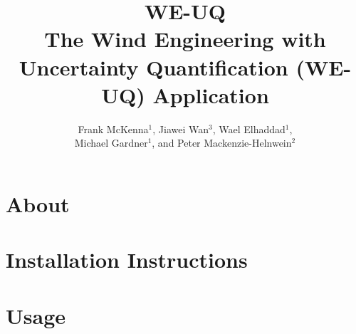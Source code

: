 \documentclass{simcenterdocumentation}
\begin{document}
\title{WE-UQ\\ \Large The Wind Engineering with Uncertainty Quantification (WE-UQ) Application}
\author{Frank McKenna$^{1}$, Jiawei Wan$^{3}$, Wael Elhaddad$^{1}$,\\Michael Gardner$^{1}$, and Peter Mackenzie-Helnwein$^{2}$}

\hypersetup{pageanchor=false}
\maketitle
\copyrightpage
\acknowledgments

\hypersetup{pageanchor=true}
\begin{frontmatter}

\pagestyle{plain}
{
  \renewcommand{\thispagestyle}[1]{}
  \tableofcontents
  \clearpage
  \listoffigures
  \clearpage
  \listoftables
}

\end{frontmatter}
\pagestyle{somewhatsimple}

\chapter{About}
\label{chap:about}


\chapter{Installation Instructions}
\label{chap:installation}



\chapter{Usage}
\label{chap:usage}

\end{document}
